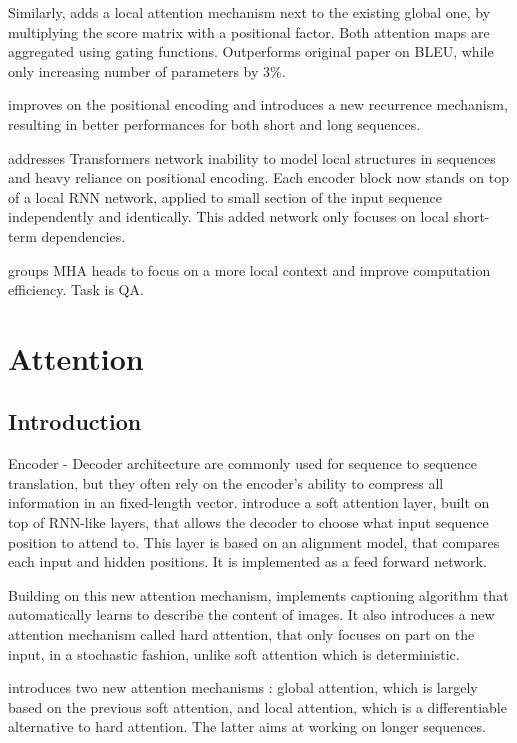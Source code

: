 \documentclass{article}
\begin{document}
    Similarly, \cite{Xu2019LeveragingLA} adds a local attention mechanism next to the existing global one, by multiplying the score matrix with a positional factor. Both attention maps are aggregated using gating functions. Outperforms original paper on BLEU, while only increasing number of parameters by 3\%.

    \cite[Transformer-XL]{Dai2019TransformerXLAL} improves on the positional encoding and introduces a new recurrence mechanism, resulting in better performances for both short and long sequences.

    \cite[R-Transformer]{Wang2019RTransformerRN} addresses Transformers network inability to model local structures in sequences and heavy reliance on positional encoding. Each encoder block now stands on top of a local RNN network, applied to small section of the input sequence independently and identically. This added network only focuses on local short-term dependencies.

    \cite{Xu2019GatedGS} groups MHA heads to focus on a more local context and improve computation efficiency. Task is QA.
    
\section{Attention}

    \subsection{Introduction}

    Encoder - Decoder architecture are commonly used for sequence to sequence translation, but they often rely on the encoder's ability to compress all information in an fixed-length vector. \cite{Bahdanau2014NeuralMT} introduce a soft attention layer, built on top of RNN-like layers, that allows the decoder to choose what input sequence position to attend to. This layer is based on an alignment model, that compares each input and hidden positions. It is implemented as a feed forward network.

    Building on this new attention mechanism, \cite{Xu2015ShowAA} implements captioning algorithm that automatically learns to describe the content of images. It also introduces a new attention mechanism called hard attention, that only focuses on part on the input, in a stochastic fashion, unlike soft attention which is deterministic.

    \cite{Luong2015EffectiveAT} introduces two new attention mechanisms : global attention, which is largely based on the previous soft attention, and local attention, which is a differentiable alternative to hard attention. The latter aims at working on longer sequences.
\end{document}
